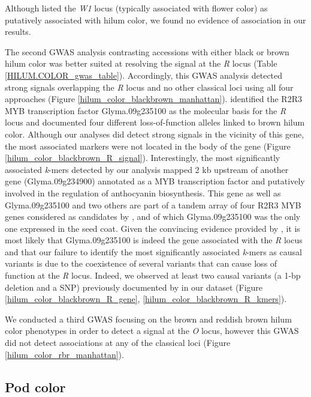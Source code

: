 Although \cite{bandillo2017} listed the \textit{W1} locus (typically associated
with flower color) as putatively associated with hilum color, we found no
evidence of association in our results.

The second GWAS analysis contrasting accessions with either black or brown hilum
color was better suited at resolving the signal at the \emph{R} locus (Table
\ref{HILUM.COLOR_gwas_table}). Accordingly, this GWAS analysis detected strong
signals overlapping the \emph{R} locus and no other classical loci using all
four approaches (Figure \ref{hilum_color_blackbrown_manhattan}).
\cite{gillman2011} identified the R2R3 MYB transcription factor Glyma.09g235100
as the molecular basis for the \emph{R} locus and documented four different
loss-of-function alleles linked to brown hilum color. Although our analyses did
detect strong signals in the vicinity of this gene, the most associated markers
were not located in the body of the gene (Figure
\ref{hilum_color_blackbrown_R_signal}). Interestingly, the most significantly
associated \emph{k}-mers detected by our analysis mapped 2 kb upstream of
another gene (Glyma.09g234900) annotated as a MYB transcription factor and
putatively involved in the regulation of anthocyanin biosynthesis. This gene
as well as Glyma.09g235100 and two others are part of a tandem array of four
R2R3 MYB genes considered as candidates by \cite{gillman2011}, and of which
Glyma.09g235100 was the only one expressed in the seed coat. Given the
convincing evidence provided by \cite{gillman2011}, it is most likely that
Glyma.09g235100 is indeed the gene associated with the \emph{R} locus and that
our failure to identify the most significantly associated \emph{k}-mers as
causal variants is due to the coexistence of several variants that can cause
loss of function at the \emph{R} locus. Indeed, we observed at least two causal
variants (a 1-bp deletion and a SNP) previously documented by
\cite{gillman2011} in our dataset (Figure \ref{hilum_color_blackbrown_R_gene},
\ref{hilum_color_blackbrown_R_kmers}).

We conducted a third GWAS focusing on the brown and reddish brown hilum color
phenotypes in order to detect a signal at the \emph{O} locus, however this GWAS
did not detect associations at any of the classical loci (Figure
\ref{hilum_color_rbr_manhattan}).

\subsection*{Pod color}
\label{sv-gwas-pod-color}

